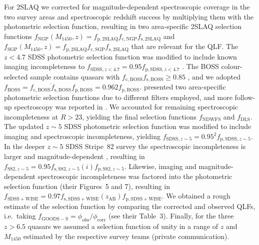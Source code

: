 \documentclass[fleqn,usenatbib]{mnras}
\begin{document}
For 2SLAQ we corrected for magnitude-dependent spectroscopic coverage
in the two survey areas \citep[$f_\mathrm{c,NGP}\left(g\right)$ and
  $f_\mathrm{c,SGP}\left(g\right)$; Figure~4
  in][]{2009MNRAS.392...19C} and spectroscopic redshift success
\citep[$f_\mathrm{s,2SLAQ}\left(g\right)$; Figure~6b
  in][]{2009MNRAS.392...19C} by multiplying them with the photometric
selection function, resulting in two area-specific 2SLAQ selection
functions
$f_\mathrm{NGP}\left(M_{1450},z\right)=f_\mathrm{p,2SLAQ}f_\mathrm{c,NGP}f_\mathrm{s,2SLAQ}$
and
$f_\mathrm{SGP}\left(M_{1450},z\right)=f_\mathrm{p,2SLAQ}f_\mathrm{c,SGP}f_\mathrm{s,2SLAQ}$
that are relevant for the QLF.  The $z<4.7$ SDSS photometric selection
function was modified to include known imaging incompleteness to
$f_{\mathrm{SDSS},z<4.7}=0.95f_{\mathrm{p,SDSS},z<4.7}$
\citep{2006AJ....131.2766R}. The BOSS colour-selected sample contains
quasars with $f_\mathrm{c,BOSS}f_\mathrm{s,BOSS}\ge 0.85$
\citep{2013ApJ...773...14R}, and we adopted
$f_\mathrm{BOSS}=\overline{f_\mathrm{c,BOSS}f_\mathrm{s,BOSS}}f_\mathrm{p,BOSS}=0.962f_\mathrm{p,BOSS}$. \citet{2010ApJ...710.1498G}
presented two area-specific photometric selection functions due to
different filters employed, and more follow-up spectroscopy was
reported in \citet{2011ApJ...728L..26G}. We accounted for remaining
spectroscopic incompleteness at $R>23$, yielding the final selection
functions $f_\mathrm{NDWFS}$ and $f_\mathrm{DLS}$. The updated $z\sim
5$ SDSS photometric selection function \citep{2013ApJ...768..105M} was
modified to include imaging and spectroscopic incompleteness, yielding
$f_{\mathrm{SDSS},z\sim 5}=0.95^2f_{\mathrm{p,SDSS},z\sim 5}$. In the
deeper $z\sim 5$ SDSS Stripe~82 survey the spectroscopic
incompleteness is larger and magnitude-dependent \citep[Figure~14
  in][]{2013ApJ...768..105M}, resulting in $f_{\mathrm{S82},z\sim
  5}=0.95f_{\mathrm{s,S82},z\sim
  5}\left(i\right)f_{\mathrm{p,S82},z\sim 5}$. Likewise, imaging and
magnitude-dependent spectroscopic incompleteness was factored into the
\citet{2016ApJ...829...33Y} photometric selection function (their
Figures~5 and 7), resulting in
$f_\mathrm{SDSS+WISE}=0.97f_\mathrm{s,SDSS+WISE}\left(z_\mathrm{AB}\right)f_\mathrm{p,SDSS+WISE}$.
We obtained a rough estimate of the
\citet{2015AA...578A..83G} selection function by comparing the
corrected and observed QLFs, i.e.\ taking
$f_\mathrm{GOODS-S}=\phi_\mathrm{obs}/\phi_\mathrm{corr}$ (see their
Table~3).
Finally, for the three $z>6.5$ quasars we assumed a selection function of
unity in a range of $z$ and $M_{1450}$ estimated by the respective survey teams
(private communication).
\end{document}
